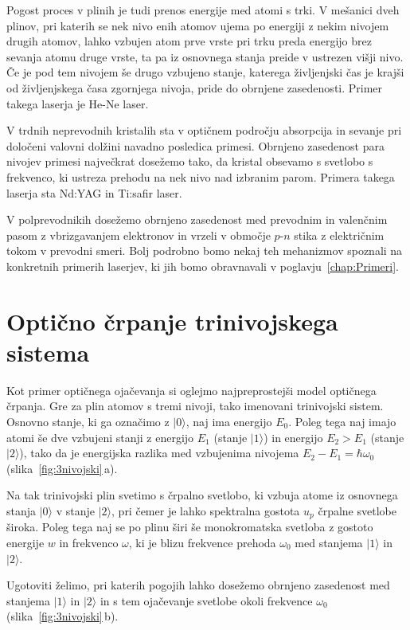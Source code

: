 Pogost proces v plinih je tudi prenos energije med atomi s trki. V
mešanici dveh plinov, pri katerih se nek nivo enih atomov ujema po energiji z
nekim nivojem drugih atomov, lahko vzbujen atom prve vrste pri trku preda 
energijo brez sevanja atomu druge vrste, ta pa iz osnovnega stanja preide v 
ustrezen višji nivo. Če je pod tem nivojem še drugo vzbujeno stanje, katerega
življenjski čas je krajši od življenjskega časa zgornjega nivoja, pride
do obrnjene zasedenosti. Primer takega laserja je He-Ne laser.

V trdnih neprevodnih kristalih sta v optičnem področju absorpcija
in sevanje pri določeni valovni dolžini navadno posledica primesi.
Obrnjeno zasedenost para nivojev primesi največkrat dosežemo tako, da
kristal obsevamo s svetlobo s frekvenco, ki ustreza prehodu na nek
nivo nad izbranim parom. Primera takega laserja sta Nd:YAG in Ti:safir 
laser.  

V polprevodnikih dosežemo obrnjeno zasedenost med 
prevodnim in valenčnim pasom z vbrizgavanjem elektronov in vrzeli v območje $p$-$n$ 
stika z električnim tokom v prevodni smeri. Bolj podrobno bomo nekaj teh mehanizmov spoznali 
na konkretnih primerih laserjev, ki jih bomo obravnavali v poglavju~\ref{chap:Primeri}. 

\section{Optično črpanje trinivojskega sistema}
Kot primer optičnega ojačevanja si oglejmo najpreprostejši model optičnega črpanja.
Gre za plin atomov s tremi nivoji, tako imenovani trinivojski sistem. Osnovno stanje, ki 
ga označimo z $|0\rangle$,  naj ima energijo $E_0$. Poleg tega naj imajo atomi še 
dve vzbujeni stanji z energijo $E_1$ (stanje $|1\rangle$) in energijo $E_2>E_1$
(stanje $|2\rangle$), tako da je energijska razlika med vzbujenima 
nivojema $E_2-E_1 = \hbar \omega_0$ (slika~\ref{fig:3nivojski}\,a).

Na tak trinivojski plin svetimo s črpalno svetlobo, ki vzbuja atome iz osnovnega stanja 
$|0\rangle$ v stanje $|2\rangle$, pri čemer je lahko spektralna gostota $u_{p}$ črpalne 
svetlobe široka. Poleg tega naj se po plinu širi še monokromatska svetloba z gostoto 
energije $w$ in frekvenco $\omega$, ki je blizu frekvence prehoda $\omega_{0}$ med 
stanjema $|1\rangle$ in $|2\rangle$. 

Ugotoviti želimo, pri katerih pogojih lahko dosežemo obrnjeno zasedenost med 
stanjema $|1\rangle$ in $|2\rangle$ in s tem ojačevanje svetlobe okoli 
frekvence $\omega_{0}$ (slika~\ref{fig:3nivojski}\,b).

